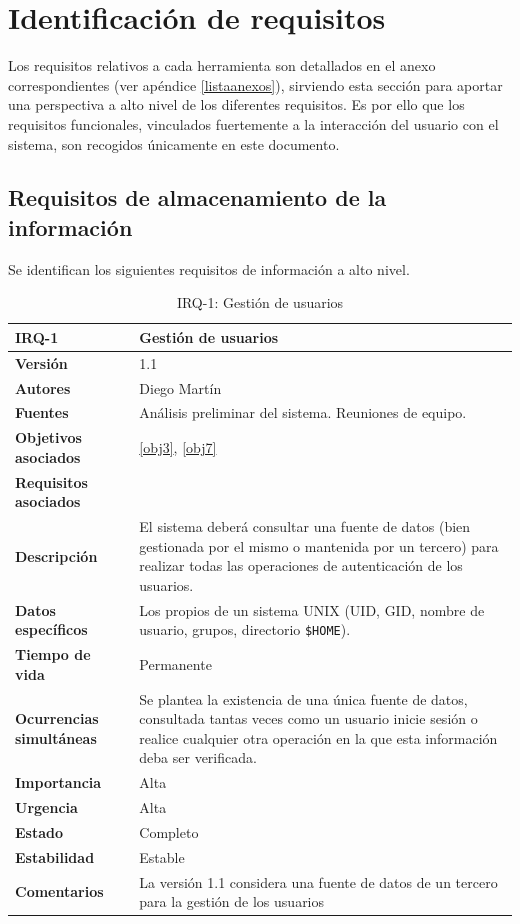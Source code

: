 \section{Identificación de requisitos}

Los requisitos relativos a cada herramienta son detallados en el anexo correspondientes (ver apéndice \ref{listaanexos}), sirviendo esta sección para aportar una perspectiva a alto nivel de los diferentes requisitos. Es por ello que los requisitos funcionales, vinculados fuertemente a la interacción del usuario con el sistema, son recogidos únicamente en este documento.

\subsection{Requisitos de almacenamiento de la información}

Se identifican los siguientes requisitos de información a alto nivel.

\begin{table}[H]
\centering
\begin{tabular}{|p{3.5cm}|p{10cm}|}
\hline
\textbf{IRQ-1} & Gestión de usuarios\\
\hline
\textbf{Versión} & 1.1\\
\hline
\textbf{Autores} &Diego Martín\\
\hline
\textbf{Fuentes} & Análisis preliminar del sistema. Reuniones de equipo.\\
\hline
\textbf{Objetivos asociados} & \ref{obj3}, \ref{obj7}\\
\hline
\textbf{Requisitos asociados} &\\
\hline
\textbf{Descripción} & El sistema deberá consultar una fuente de datos (bien gestionada por el mismo o mantenida por un tercero) para realizar todas las operaciones de autenticación de los usuarios.\\
\hline
\textbf{Datos específicos} & Los propios de un sistema UNIX (UID, GID, nombre de usuario, grupos, directorio \texttt{\$HOME}).\\
\hline
\textbf{Tiempo de vida} & Permanente\\
\hline
\textbf{Ocurrencias simultáneas} & Se plantea la existencia de una única fuente de datos, consultada tantas veces como un usuario inicie sesión o realice cualquier otra operación en la que esta información deba ser verificada.\\
\hline
\textbf{Importancia} & Alta\\
\hline
\textbf{Urgencia} & Alta\\
\hline
\textbf{Estado} & Completo\\
\hline
\textbf{Estabilidad} & Estable\\
\hline
\textbf{Comentarios} & La versión 1.1 considera una fuente de datos de un tercero para la gestión de los usuarios\\
\hline
\end{tabular}
\caption{IRQ-1: Gestión de usuarios}
\end{table}

